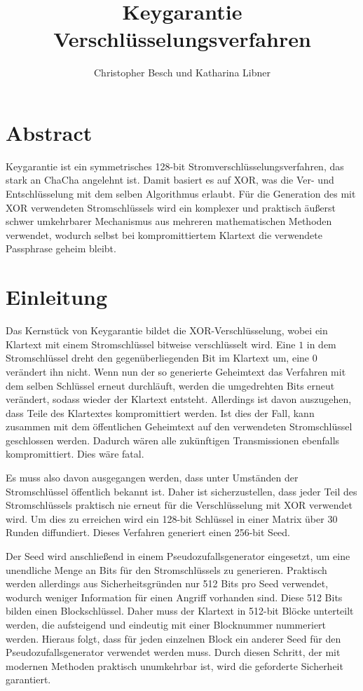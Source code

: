 \documentclass[10pt,a4paper]{article}
\author{Christopher Besch und Katharina Libner}
\title{Keygarantie Verschlüsselungsverfahren}
\begin{document}
\maketitle
\tableofcontents
\newpage

\section{Abstract}

Keygarantie ist ein symmetrisches 128-bit Stromverschlüsselungsverfahren, das stark an ChaCha angelehnt ist\cite{Bernstein2008}.
Damit basiert es auf XOR, was die Ver- und Entschlüsselung mit dem selben Algorithmus erlaubt.
Für die Generation des mit XOR verwendeten Stromschlüssels wird ein komplexer und praktisch äußerst schwer umkehrbarer Mechanismus aus mehreren mathematischen Methoden verwendet, wodurch selbst bei kompromittiertem Klartext die verwendete Passphrase geheim bleibt.

\section{Einleitung}

Das Kernstück von Keygarantie bildet die XOR-Verschlüsselung, wobei ein Klartext mit einem Stromschlüssel bitweise verschlüsselt wird.
Eine $1$ in dem Stromschlüssel dreht den gegenüberliegenden Bit im Klartext um, eine $0$ verändert ihn nicht.
Wenn nun der so generierte Geheimtext das Verfahren mit dem selben Schlüssel erneut durchläuft, werden die umgedrehten Bits erneut verändert, sodass wieder der Klartext entsteht.
Allerdings ist davon auszugehen, dass Teile des Klartextes kompromittiert werden.
Ist dies der Fall, kann zusammen mit dem öffentlichen Geheimtext auf den verwendeten Stromschlüssel geschlossen werden.
Dadurch wären alle zukünftigen Transmissionen ebenfalls kompromittiert.
Dies wäre fatal.

\medskip
Es muss also davon ausgegangen werden, dass unter Umständen der Stromschlüssel öffentlich bekannt ist.
Daher ist sicherzustellen, dass jeder Teil des Stromschlüssels praktisch nie erneut für die Verschlüsselung mit XOR verwendet wird.
Um dies zu erreichen wird ein 128-bit Schlüssel in einer Matrix über 30 Runden diffundiert.
Dieses Verfahren generiert einen 256-bit Seed.

\medskip
Der Seed wird anschließend in einem Pseudozufallsgenerator eingesetzt, um eine unendliche Menge an Bits für den Stromschlüssels zu generieren.
Praktisch werden allerdings aus Sicherheitsgründen nur 512 Bits pro Seed verwendet, wodurch weniger Information für einen Angriff vorhanden sind.
Diese 512 Bits bilden einen Blockschlüssel.
Daher muss der Klartext in 512-bit Blöcke unterteilt werden, die aufsteigend und eindeutig mit einer Blocknummer nummeriert werden.
Hieraus folgt, dass für jeden einzelnen Block ein anderer Seed für den Pseudozufallsgenerator verwendet werden muss.
Durch diesen Schritt, der mit modernen Methoden praktisch unumkehrbar ist, wird die geforderte Sicherheit garantiert.
\end{document}
